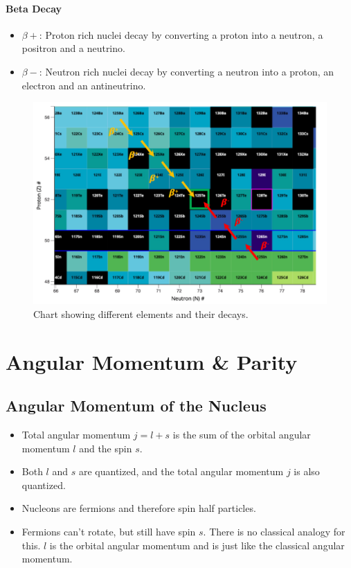 \documentclass{article}
\begin{document}
\paragraph{Beta Decay}
\begin{itemize}
    \item $β+$: Proton rich nuclei decay by converting a proton into a neutron, a positron and a neutrino. 
    \item $β-$: Neutron rich nuclei decay by converting a neutron into a proton, an electron and an antineutrino.
\end{itemize}
\begin{figure}[h!]
\centering
\includegraphics[width = \textwidth]{bet_decay_chart.png}
\caption{Chart showing different elements and their decays.}
\label{fig: bet_decay_chart}
\end{figure}


\section{Angular Momentum \& Parity}
\subsection{Angular Momentum of the Nucleus}
\begin{itemize}
    \item Total angular momentum $j = l + s$ is the sum of the orbital angular momentum $l$ and the spin $s$. 
    \item Both $l$ and $s$ are quantized, and the total angular momentum $j$ is also quantized.
    \item Nucleons are fermions and therefore spin half particles. 
    \item Fermions can't rotate, but still have spin $s$. There is no classical analogy for this. $l$ is the orbital angular momentum and is just like the classical angular momentum.
\end{itemize}
\end{document}
